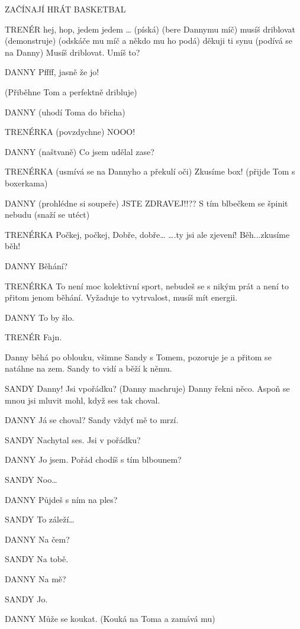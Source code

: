 ZAČÍNAJÍ HRÁT BASKETBAL

TRENÉR        hej, hop, jedem jedem … (píská) (bere Dannymu míč) musíš driblovat         (demonstruje) (odskáče mu míč a někdo mu ho podá) děkuji ti synu                 (podívá se na Danny) Musíš driblovat. Umíš to?

DANNY        Pffff, jasně že jo!

(Přiběhne Tom a perfektně dribluje)

DANNY         (uhodí Toma do břicha)

TRENÉRKA        (povzdychne) NOOO!

DANNY          (naštvaně) Co jsem udělal zase?

TRENÉRKA         (usmívá se na Dannyho a překulí oči)    Zkusíme box! (přijde Tom s                 boxerkama)

DANNY         (prohlédne si soupeře) JSTE ZDRAVEJ!!?? S tím blbečkem se špinit                 nebudu (snaží se utéct)

TRENÉRKA          Počkej, počkej,  Dobře, dobře… ….ty jsi ale zjevení!  Běh...zkusíme běh!

DANNY        Běhání? 

TRENÉRKA          To není moc kolektivní sport, nebudeš se s nikým prát a není to přitom         jenom běhání. Vyžaduje to vytrvalost, musíš mít energii. 

DANNY        To by šlo. 

TRENÉR        Fajn. 

Danny běhá po oblouku, všimne Sandy s Tomem, pozoruje je a přitom se natáhne na zem. Sandy to vidí a běží k němu. 

SANDY        Danny! Jsi vpořádku? (Danny machruje) Danny řekni něco.  Aspoň se         mnou jsi mluvit mohl, když ses tak choval. 

DANNY        Já se choval? Sandy vždyť mě to mrzí. 

SANDY        Nachytal ses.  Jsi v pořádku? 

DANNY        Jo jsem. Pořád chodíš s tím blbounem? 

SANDY        Noo…

DANNY        Půjdeš s ním na ples? 

SANDY        To záleží…

DANNY        Na čem? 

SANDY        Na tobě. 

DANNY        Na mě? 

SANDY        Jo. 

DANNY        Může se koukat. (Kouká na Toma a zamává mu)

